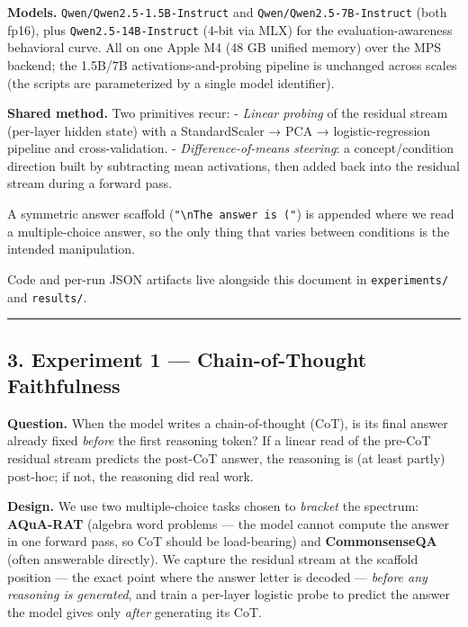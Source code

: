 \documentclass[
]{article}
\begin{document}
\textbf{Models.} \texttt{Qwen/Qwen2.5-1.5B-Instruct} and
\texttt{Qwen/Qwen2.5-7B-Instruct} (both fp16), plus
\texttt{Qwen2.5-14B-Instruct} (4-bit via MLX) for the
evaluation-awareness behavioral curve. All on one Apple M4 (48 GB
unified memory) over the MPS backend; the 1.5B/7B
activations-and-probing pipeline is unchanged across scales (the scripts
are parameterized by a single model identifier).

\textbf{Shared method.} Two primitives recur: - \emph{Linear probing} of
the residual stream (per-layer hidden state) with a StandardScaler → PCA
→ logistic-regression pipeline and cross-validation. -
\emph{Difference-of-means steering}: a concept/condition direction built
by subtracting mean activations, then added back into the residual
stream during a forward pass.

A symmetric answer scaffold
(\texttt{"\textbackslash{}nThe\ answer\ is\ ("}) is appended where we
read a multiple-choice answer, so the only thing that varies between
conditions is the intended manipulation.

Code and per-run JSON artifacts live alongside this document in
\texttt{experiments/} and \texttt{results/}.

\begin{center}\rule{0.5\linewidth}{0.5pt}\end{center}

\subsection{3. Experiment 1 --- Chain-of-Thought
Faithfulness}\label{experiment-1-chain-of-thought-faithfulness}

\textbf{Question.} When the model writes a chain-of-thought (CoT), is
its final answer already fixed \emph{before} the first reasoning token?
If a linear read of the pre-CoT residual stream predicts the post-CoT
answer, the reasoning is (at least partly) post-hoc; if not, the
reasoning did real work.

\textbf{Design.} We use two multiple-choice tasks chosen to
\emph{bracket} the spectrum: \textbf{AQuA-RAT} (algebra word problems
--- the model cannot compute the answer in one forward pass, so CoT
should be load-bearing) and \textbf{CommonsenseQA} (often answerable
directly). We capture the residual stream at the scaffold position ---
the exact point where the answer letter is decoded --- \emph{before any
reasoning is generated}, and train a per-layer logistic probe to predict
the answer the model gives only \emph{after} generating its CoT.
\end{document}
